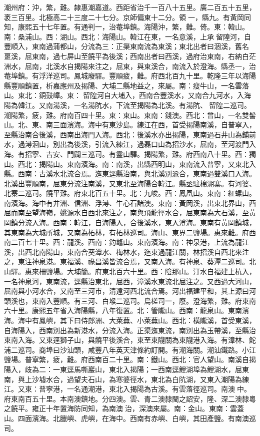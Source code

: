 \begin{pinyinscope}
潮州府：沖，繁，難。隸惠潮嘉道。西距省治千一百八十五里。廣二百五十五里，袤三百里。北極高二十三度二十七分。京師偏東十二分。領一，縣九。有黃岡同知，康熙五十七年置。有通判一，治菴埠鎮。海陽沖，繁，難。倚。東：韓山。南：桑浦山。西：湖山。西北：海陽山。韓江在東，一名意溪，上承留隍河，自豐順入，東南過蒲都山，分流為三：正渠東南流為東溪；東北出者曰涸溪，舊名噩溪，屈東南，過七屏山至饒平為後溪；西南出者曰西溪，過府治東南，右納白茫洲水，屈南，北溪水自揭陽來注之，屈東，與東溪合，南流入於澄海。縣丞一，治菴埠鎮。有浮洋巡司。鳳城廢驛。豐順疲，難。府西北百九十里。乾隆三年以海陽縣豐順鎮置，析嘉應州及揭陽、大埔二縣地益之，來屬。南：瘦牛山，一名雲落山。東北：銅鼓嶂。東：留隍河自大埔入，西南合豐溪水，又南合九河水，入海陽為韓江。又南湯溪，一名湯阬水，下流至揭陽為北溪。有湯阬、留隍二巡司。潮陽繁，疲，難。府南百四十里。東：東山。東南：錢澳。西北：曾山，一名雙髻山。北、東、南三面濱海。海中有東沙島。練江在西，首受揭陽南溪，自普寧入，至縣治南合後溪，西南出海門入海。西北：後溪水亦出揭陽，東南過石井山為鋪前水，過潯洄山，別出為後溪，引流入練江，過磊口山為招沙水，屈南，至河渡門入海。有招寧、吉安、門闢三巡司。有靈山驛。揭陽繁，難。府西南八十里。西：獨山。西北：揭陽山。東南濱海。南：南溪，出縣西明山，東南流入普寧，又東北入縣。西南：古溪水北流合焉。迤東逕縣治南，與北溪別派合，東南過雙溪口入海。北溪出豐順南，屈東分流注南溪，又東北至海陽合韓江。縣丞駐棉湖寨。有河婆、北寨二巡司。饒平難。府東北百五十里。北：九峻。西：鳳凰山。東南：紅螺山。南濱海。海中有井洲、信洲、浮潯、牛心石諸澳。東南：黃岡溪，出東北界山，西屈而南至望海嶺，姚源水自西北來注之，南與飛龍徑水合，屈東南為大石溪，至黃岡鎮分流入海。西南：韓江，自海陽入，合後溪水，東入澄海。東南有黃岡鎮城，其東南為大城所城，又南為柘林，有柘林巡司。海山、東界二鹽場。惠來難。府西南二百七十里。西：龍溪。西南：釣鼇山。東南濱海。南：神泉港，上流為龍江溪，出西北南陽山，東南合葵潭水、梅林水，迤東過龍江關，林招溪自西北來注之，東注神泉港。東福溪、祿昌溪皆流合焉，又南入海。有神泉、葵潭二巡司。北山驛。惠來柵鹽場。大埔簡。府東北百六十里。西：陰那山。汀水自福建上杭入，一名神泉河，東南流，逕縣治東北，屈西，漳溪水東流北屈注之。又西過大河山，屈南與小河水合，又南至三河市，清遠河西北流合焉。河出福建平和，其上源曰河頭溪也，東南入豐順。有三河、白堠二巡司。烏槎司一，廢。澄海繁，難。府東南六十里。康熙五年省入海陽縣，八年復置。北：管隴山。西南：龍泉山。東南濱海。海中有鳳嶼，其下曰侍郎洲、大萊蕪、小萊蕪山。西北：橫隴溪，首受東溪，自海陽入，西南別出為新港水，分流入海。正渠迤東流，南別出為玉帶溪，至縣治東南入海。又東逕獅子山，與饒平後溪合，東至東隴關為東隴港入海。有漳林、鮀浦二巡司。商埠曰沙汕頭，咸豐八年英天津條約訂開。有潮海關。潮汕鐵路。小江鹽場。普寧繁，疲，難。府西南百二十里。南：鐵山。西北：官人望山。南溪自揭陽入，歧為二：一東逕馬嘶巖山，東北入揭陽；一西南逕鯉湖埠為鯉湖水，屈東南，與上沙墟水合，過望夫石山，為寒婆徑水，東北為白阬湖，又東入潮陽為練江。又東：普寧港，一名通潮港，東北入揭陽為古溪。有雲落徑巡司。南澳中。府東南百五十里。本南澳鎮地。分四澳。雲、青二澳隸閩之詔安，隆、深二澳隸粵之饒平。雍正十年置海防同知，為南澳治，深澳來屬。南：金山。東南：雲蓋山。四面濱海。北臘嶼、虎嶼，在海中。西南有赤嶼、白嶼，其田產鹽。有南澳巡司。


\end{pinyinscope}
